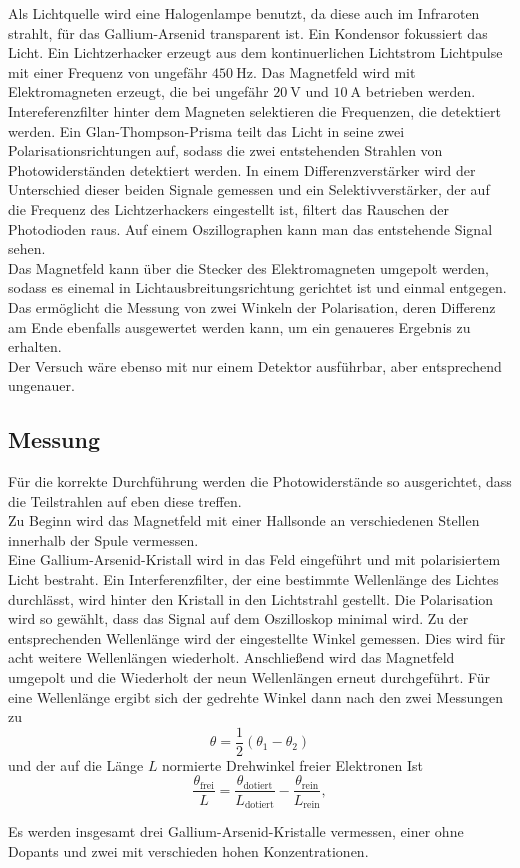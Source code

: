 Als Lichtquelle wird eine Halogenlampe benutzt, da diese auch im Infraroten strahlt, für das Gallium-Arsenid transparent ist. Ein Kondensor fokussiert das Licht. Ein Lichtzerhacker erzeugt aus dem kontinuerlichen
Lichtstrom Lichtpulse mit einer Frequenz von ungefähr $\qty{450}{\hertz}$. Das Magnetfeld wird mit Elektromagneten erzeugt, die bei ungefähr $\qty{20}{\volt}$ und $\qty{10}{\ampere}$ betrieben werden. Intereferenzfilter hinter
dem Magneten selektieren die Frequenzen, die detektiert werden. Ein Glan-Thompson-Prisma teilt das Licht in seine zwei Polarisationsrichtungen auf, sodass die zwei entstehenden Strahlen von Photowiderständen detektiert werden.
In einem Differenzverstärker wird der Unterschied dieser beiden Signale gemessen und ein Selektivverstärker, der auf die Frequenz des Lichtzerhackers eingestellt ist, filtert das Rauschen der Photodioden raus. Auf einem Oszillographen
kann man das entstehende Signal sehen. \\

Das Magnetfeld kann über die Stecker des Elektromagneten umgepolt werden, sodass es einemal in Lichtausbreitungsrichtung gerichtet ist und einmal entgegen. Das ermöglicht die Messung von zwei Winkeln der Polarisation,
deren Differenz am Ende ebenfalls ausgewertet werden kann, um ein genaueres Ergebnis zu erhalten. \\

Der Versuch wäre ebenso mit nur einem Detektor ausführbar, aber entsprechend ungenauer.\\

\subsection{Messung}

Für die korrekte Durchführung werden die Photowiderstände so ausgerichtet, dass die Teilstrahlen auf eben diese treffen. \\
Zu Beginn wird das Magnetfeld mit einer Hallsonde an verschiedenen Stellen innerhalb der Spule vermessen. \\

Eine Gallium-Arsenid-Kristall wird in das Feld eingeführt und mit polarisiertem Licht bestraht. Ein Interferenzfilter, der eine bestimmte Wellenlänge des Lichtes durchlässt, wird hinter den Kristall in den Lichtstrahl gestellt.
Die Polarisation wird so gewählt, dass das Signal auf dem Oszilloskop minimal wird. Zu der entsprechenden Wellenlänge wird der eingestellte Winkel gemessen. Dies wird für acht weitere Wellenlängen wiederholt. Anschließend wird das Magnetfeld
umgepolt und die Wiederholt der neun Wellenlängen erneut durchgeführt. Für eine Wellenlänge ergibt sich der gedrehte Winkel dann nach den zwei Messungen zu
\begin{equation}
    \theta = \frac{1}{2}(\theta_1 - \theta_2)
    \label{eq:theta}
\end{equation}
und der auf die Länge $L$ normierte Drehwinkel freier Elektronen Ist
\begin{equation}
    \frac{\theta_\text{frei}}{L} = \frac{\theta_\text{dotiert}}{L_\text{dotiert}} - \frac{\theta_\text{rein}}{L_\text{rein}},
    \label{eq:thetafrei}
\end{equation}

Es werden insgesamt drei Gallium-Arsenid-Kristalle vermessen, einer ohne Dopants und zwei mit verschieden hohen Konzentrationen. \\

